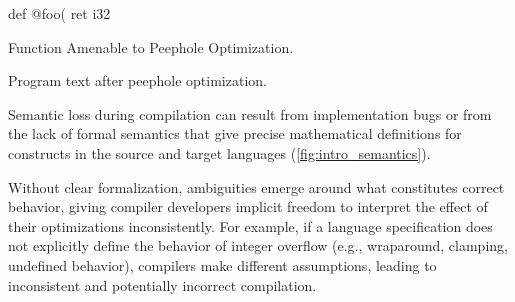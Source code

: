 \documentclass[review, anonymous, acmsmall, screen]{acmart}
\DeclareRobustCommand{\circled}[2][]{%
    \ifthenelse{\isempty{#1}}%
        {\circledbase{pairedOneLightBlue}{#2}}%
        {\autoref{#1}: \hyperref[#1]{\circledbase{pairedOneLightBlue}{#2}}}%
}
\begin{document}
\begin{listing}[H]
def @foo(%
 {
  ret i32 %
 }
\caption{Function Amenable to Peephole Optimization.}
\label{lst:example-peephole-opportunity}
\end{listing}
\begin{listing}[H]
\caption{Program text after peephole optimization.}
\label{lst:example-peephole-optimized}
\end{listing}
Semantic loss during compilation can result from implementation bugs or from the lack of formal 
semantics that give precise mathematical definitions for constructs in the source and target languages
(\autoref{fig:intro_semantics}). 

 Without clear formalization, ambiguities emerge around what 
 constitutes correct behavior, giving compiler developers implicit freedom to interpret the effect 
 of their optimizations inconsistently. For example, if a language specification does not explicitly 
 define the behavior of integer overflow (e.g., wraparound, clamping, undefined behavior), compilers
  make different assumptions, leading to inconsistent and potentially incorrect compilation.
\end{document}
